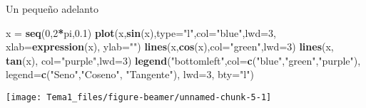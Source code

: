 \documentclass[
  ignorenonframetext,
]{beamer}
\newenvironment{Shaded}{\begin{snugshade}}{\end{snugshade}}
\newcommand{\DataTypeTok}[1]{\textcolor[rgb]{0.13,0.29,0.53}{#1}}
\newcommand{\DecValTok}[1]{\textcolor[rgb]{0.00,0.00,0.81}{#1}}
\newcommand{\FloatTok}[1]{\textcolor[rgb]{0.00,0.00,0.81}{#1}}
\newcommand{\KeywordTok}[1]{\textcolor[rgb]{0.13,0.29,0.53}{\textbf{#1}}}
\newcommand{\NormalTok}[1]{#1}
\newcommand{\OperatorTok}[1]{\textcolor[rgb]{0.81,0.36,0.00}{\textbf{#1}}}
\newcommand{\StringTok}[1]{\textcolor[rgb]{0.31,0.60,0.02}{#1}}
\begin{document}
\begin{frame}[fragile]{Un pequeño adelanto}
\protect\hypertarget{un-pequeuxf1o-adelanto}{}

\begin{Shaded}
\begin{Highlighting}[]
\NormalTok{x =}\StringTok{ }\KeywordTok{seq}\NormalTok{(}\DecValTok{0}\NormalTok{,}\DecValTok{2}\OperatorTok{*}\NormalTok{pi,}\FloatTok{0.1}\NormalTok{)}
\KeywordTok{plot}\NormalTok{(x,}\KeywordTok{sin}\NormalTok{(x),}\DataTypeTok{type=}\StringTok{"l"}\NormalTok{,}\DataTypeTok{col=}\StringTok{"blue"}\NormalTok{,}\DataTypeTok{lwd=}\DecValTok{3}\NormalTok{, }\DataTypeTok{xlab=}\KeywordTok{expression}\NormalTok{(x), }\DataTypeTok{ylab=}\StringTok{""}\NormalTok{)}
\KeywordTok{lines}\NormalTok{(x,}\KeywordTok{cos}\NormalTok{(x),}\DataTypeTok{col=}\StringTok{"green"}\NormalTok{,}\DataTypeTok{lwd=}\DecValTok{3}\NormalTok{)}
\KeywordTok{lines}\NormalTok{(x, }\KeywordTok{tan}\NormalTok{(x), }\DataTypeTok{col=}\StringTok{"purple"}\NormalTok{,}\DataTypeTok{lwd=}\DecValTok{3}\NormalTok{)}
\KeywordTok{legend}\NormalTok{(}\StringTok{"bottomleft"}\NormalTok{,}\DataTypeTok{col=}\KeywordTok{c}\NormalTok{(}\StringTok{"blue"}\NormalTok{,}\StringTok{"green"}\NormalTok{,}\StringTok{"purple"}\NormalTok{),}
     \DataTypeTok{legend=}\KeywordTok{c}\NormalTok{(}\StringTok{"Seno"}\NormalTok{,}\StringTok{"Coseno"}\NormalTok{, }\StringTok{"Tangente"}\NormalTok{), }\DataTypeTok{lwd=}\DecValTok{3}\NormalTok{, }\DataTypeTok{bty=}\StringTok{"l"}\NormalTok{)}
\end{Highlighting}
\end{Shaded}

\begin{center}\texttt{[image: Tema1\_files/figure-beamer/unnamed-chunk-5-1]} \end{center}

\end{frame}
\end{document}
